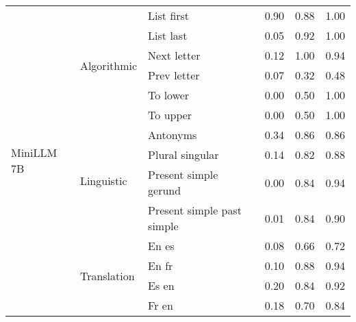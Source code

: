 \begin{center}
\begin{longtable}{lllrrr}
\multirow[t]{14}{*}{MiniLLM 7B} & \multirow[t]{6}{*}{Algorithmic} & List first & 0.90 & 0.88 & 1.00 \\
 &  & List last & 0.05 & 0.92 & 1.00 \\
 &  & Next letter & 0.12 & 1.00 & 0.94 \\
 &  & Prev letter & 0.07 & 0.32 & 0.48 \\
 &  & To lower & 0.00 & 0.50 & 1.00 \\
 &  & To upper & 0.00 & 0.50 & 1.00 \\
\cline{2-6}
 & \multirow[t]{4}{*}{Linguistic} & Antonyms & 0.34 & 0.86 & 0.86 \\
 &  & Plural singular & 0.14 & 0.82 & 0.88 \\
 &  & Present simple gerund & 0.00 & 0.84 & 0.94 \\
 &  & Present simple past simple & 0.01 & 0.84 & 0.90 \\
\cline{2-6}
 & \multirow[t]{4}{*}{Translation} & En es & 0.08 & 0.66 & 0.72 \\
 &  & En fr & 0.10 & 0.88 & 0.94 \\
 &  & Es en & 0.20 & 0.84 & 0.92 \\
 &  & Fr en & 0.18 & 0.70 & 0.84 \\
\cline{1-6} \cline{2-6}
\bottomrule
\end{longtable}

\end{center}
\twocolumn